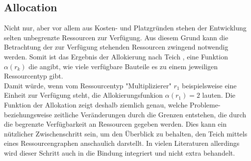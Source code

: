 \documentclass[conference]{IEEEtran}
\begin{document}
\subsection{Allocation}






Nicht nur, aber vor allem aus Kosten- und Platzgründen stehen der Entwicklung selten unbegrenzte Ressourcen zur Verfügung. Aus diesem Grund kann die Betrachtung der zur Verfügung stehenden Ressourcen zwingend notwendig werden. Somit ist das Ergebnis der Allokierung nach Teich \cite{1}    
, eine Funktion $ \alpha(r_k)$ die angibt, wie viele verfügbare Bauteile es zu einem jeweiligen Ressourcentyp gibt.\\
Damit würde, wenn vom Ressourcentyp "Multiplizierer" $r_1$ beispielsweise eine Einheit zur Verfügung steht, die Allokierungsfunkion $\alpha(r_1) = 2$ lauten. Die Funktion der Allokation zeigt deshalb ziemlich genau, welche Probleme- beziehungsweise zeitliche Veränderungen durch die Grenzen entstehen, die durch die begrenzte Verfügbarkeit an Ressourcen gegeben werden. Dies kann ein nützlicher Zwischenschritt sein, um den Überblick zu behalten, den Teich mittels eines Ressourcengraphen anschaulich darstellt. In vielen Literaturen allerdings wird dieser Schritt auch in die Bindung integriert und nicht extra behandelt.
\end{document}
